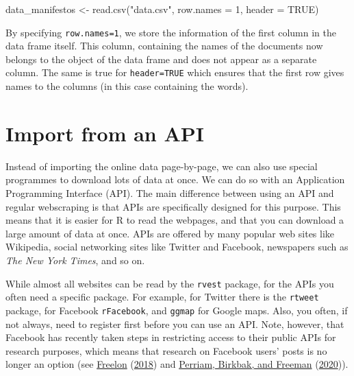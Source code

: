 \documentclass[
]{book}
\newenvironment{Shaded}{\begin{snugshade}}{\end{snugshade}}
\newcommand{\AttributeTok}[1]{\textcolor[rgb]{0.77,0.63,0.00}{#1}}
\newcommand{\ConstantTok}[1]{\textcolor[rgb]{0.00,0.00,0.00}{#1}}
\newcommand{\DecValTok}[1]{\textcolor[rgb]{0.00,0.00,0.81}{#1}}
\newcommand{\FunctionTok}[1]{\textcolor[rgb]{0.00,0.00,0.00}{#1}}
\newcommand{\NormalTok}[1]{#1}
\newcommand{\OtherTok}[1]{\textcolor[rgb]{0.56,0.35,0.01}{#1}}
\newcommand{\StringTok}[1]{\textcolor[rgb]{0.31,0.60,0.02}{#1}}
\begin{document}
\begin{Shaded}
\begin{Highlighting}[]
\NormalTok{data\_manifestos }\OtherTok{\textless{}{-}} \FunctionTok{read.csv}\NormalTok{(}\StringTok{"data.csv"}\NormalTok{, }\AttributeTok{row.names =} \DecValTok{1}\NormalTok{, }\AttributeTok{header =} \ConstantTok{TRUE}\NormalTok{)}
\end{Highlighting}
\end{Shaded}

By specifying \texttt{row.names=1}, we store the information of the first column in the data frame itself. This column, containing the names of the documents now belongs to the object of the data frame and does not appear as a separate column. The same is true for \texttt{header=TRUE} which ensures that the first row gives names to the columns (in this case containing the words).

\hypertarget{import-from-an-api}{%
\section{Import from an API}\label{import-from-an-api}}

Instead of importing the online data page-by-page, we can also use special programmes to download lots of data at once. We can do so with an Application Programming Interface (API). The main difference between using an API and regular webscraping is that APIs are specifically designed for this purpose. This means that it is easier for R to read the webpages, and that you can download a large amount of data at once. APIs are offered by many popular web sites like Wikipedia, social networking sites like Twitter and Facebook, newspapers such as \emph{The New York Times}, and so on.

While almost all websites can be read by the \texttt{rvest} package, for the APIs you often need a specific package. For example, for Twitter there is the \texttt{rtweet} package, for Facebook \texttt{rFacebook}, and \texttt{ggmap} for Google maps. Also, you often, if not always, need to register first before you can use an API. Note, however, that Facebook has recently taken steps in restricting access to their public APIs for research purposes, which means that research on Facebook users' posts is no longer an option (see \protect\hyperlink{ref-Freelon2018}{Freelon} (\protect\hyperlink{ref-Freelon2018}{2018}) and \protect\hyperlink{ref-Perriam2020}{Perriam, Birkbak, and Freeman} (\protect\hyperlink{ref-Perriam2020}{2020})).
\end{document}
